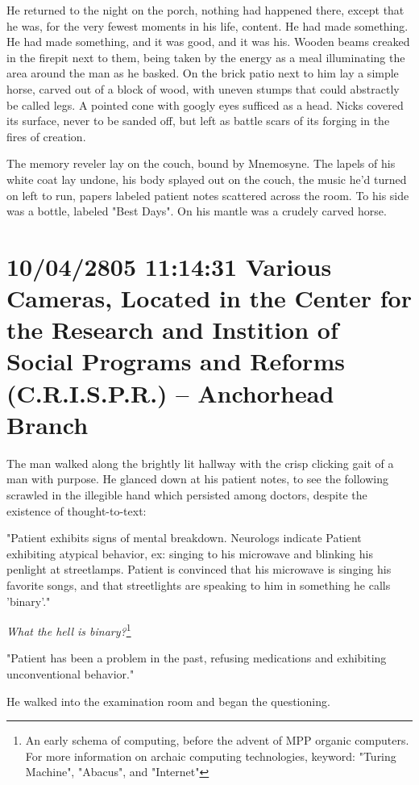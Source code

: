 \documentclass[12pt]{book}
\begin{document}
He returned to the night on the porch, nothing had happened there, except that he was, for the very fewest moments in his life, content. He had made something. He had made something, and it was good, and it was his. Wooden beams creaked in the firepit next to them, being taken by the energy as a meal illuminating the area around the man as he basked. On the brick patio next to him lay a simple horse, carved out of a block of wood, with uneven stumps that could abstractly be called legs. A pointed cone with googly eyes sufficed as a head. Nicks covered its surface, never to be sanded off, but left as battle scars of its forging in the fires of creation.

The memory reveler lay on the couch, bound by Mnemosyne. The lapels of his white coat lay undone, his body splayed out on the couch, the music he'd turned on left to run, papers labeled patient notes scattered across the room. To his side was a bottle, labeled "Best Days". On his mantle was a crudely carved horse.

\section*{10/04/2805 11:14:31 Various Cameras, Located in the Center for the Research and Instition of Social Programs and Reforms (C.R.I.S.P.R.) -- Anchorhead Branch}
\label{sec:org36b9927}

The man walked along the brightly lit hallway with the crisp clicking gait of a man with purpose. He glanced down at his patient notes, to see the following scrawled in the illegible hand which persisted among doctors, despite the existence of thought-to-text:

"Patient exhibits signs of mental breakdown. Neurologs indicate Patient exhibiting atypical behavior, ex: singing to his microwave and blinking his penlight at streetlamps. Patient is convinced that his microwave is singing his favorite songs, and that streetlights are speaking to him in something he calls 'binary'."

\emph{What the hell is binary?}\footnote{An early schema of computing, before the advent of MPP organic computers. For more information on archaic computing technologies, keyword: "Turing Machine", "Abacus", and "Internet"}

"Patient has been a problem in the past, refusing medications and exhibiting unconventional behavior."

He walked into the examination room and began the questioning.
\end{document}
